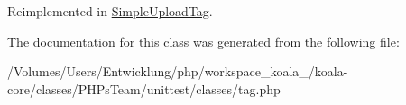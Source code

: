 Reimplemented in \hyperlink{class_simple_upload_tag_a0d75761c4b47163eff52715789037595}{SimpleUploadTag}.



The documentation for this class was generated from the following file:\begin{DoxyCompactItemize}
\item 
/Volumes/Users/Entwicklung/php/workspace\_\-koala\_/koala-\/core/classes/PHPsTeam/unittest/classes/tag.php\end{DoxyCompactItemize}
